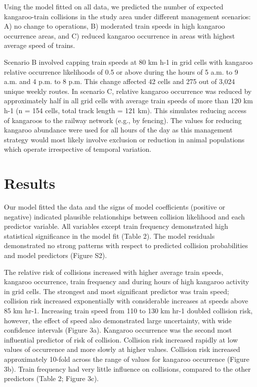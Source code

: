 Using the model fitted on all data, we predicted the number of expected kangaroo-train collisions in the study area under different management scenarios: 
A) no change to operations, 
B) moderated train speeds in high kangaroo occurrence areas, and 
C) reduced kangaroo occurrence in areas with highest average speed of trains.

Scenario B involved capping train speeds at 80 km h-1 in grid cells with kangaroo relative occurrence likelihoods of 0.5 or above during the hours of 5 a.m. to 9 a.m. and 4 p.m. to 8 p.m.  This change affected 42 cells and 275 out of 3,024 unique weekly routes.  In scenario C, relative kangaroo occurrence was reduced by approximately half in all grid cells with average train speeds of more than 120 km h-1 (n = 154 cells, total track length = 121 km). This simulates reducing access of kangaroos to the railway network (e.g., by fencing).  The values for reducing kangaroo abundance were used for all hours of the day as this management strategy would most likely involve exclusion or reduction in animal populations which operate irrespective of temporal variation.

\section{Results}

Our model fitted the data and the signs of model coefficients (positive or negative) indicated plausible relationships between collision likelihood and each predictor variable.  All variables except train frequency demonstrated high statistical significance in the model fit (Table 2). The model residuals demonstrated no strong patterns with respect to predicted collision probabilities and model predictors (Figure S2).

The relative risk of collisions increased with higher average train speeds, kangaroo occurrence, train frequency and during hours of high kangaroo activity in grid cells. The strongest and most significant predictor was train speed; collision risk increased exponentially with considerable increases at speeds above 85 km hr-1.  Increasing train speed from 110 to 130 km hr-1 doubled collision risk, however, the effect of speed also demonstrated large uncertainty, with wide confidence intervals (Figure 3a). Kangaroo occurrence was the second most influential predictor of risk of collision.  Collision risk increased rapidly at low values of occurrence and more slowly at higher values.  Collision risk increased approximately 10-fold across the range of values for kangaroo occurrence (Figure 3b). Train frequency had very little influence on collisions, compared to the other predictors (Table 2; Figure 3c).

